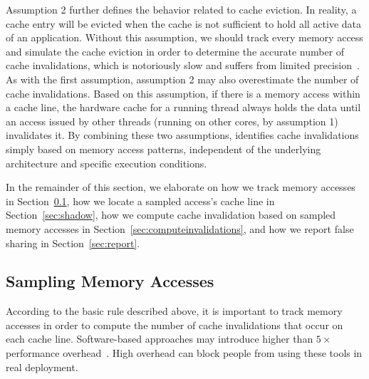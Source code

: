 Assumption 2 further defines the behavior related to cache eviction. In reality, a cache entry will be evicted when the cache is not sufficient to hold all active data of an application. Without this assumption, we should track every memory access and simulate the cache eviction in order to determine the accurate number of cache invalidations, which is notoriously slow and suffers from limited precision~\cite{falseshare:simulator}. As with the first assumption, assumption 2 may also overestimate the number of cache invalidations. Based on this assumption,  
if there is a memory access within a cache line, the hardware cache for a running thread always holds the data until an access issued by other threads (running on other cores, by assumption 1) invalidates it. %
By combining these two assumptions, \cheetah{} identifies cache invalidations simply based on memory access patterns, independent of the underlying architecture and specific execution conditions. 

In the remainder of this section, we elaborate on how we track memory accesses in Section~\ref{sec:perfcounter}, how we locate a sampled access's cache line in Section~\ref{sec:shadow}, how we compute cache invalidation based on sampled memory accesses in Section~\ref{sec:computeinvalidations}, and how we report false sharing in Section~\ref{sec:report}.

\subsection{Sampling Memory Accesses}
\label{sec:perfcounter}

According to the basic rule described above, it is important to track memory accesses in order to compute the number of cache invalidations that occur on each cache line. Software-based approaches may introduce higher than $5\times$ performance overhead~\cite{Predator, qinzhao}. High overhead can block people from using these tools in real deployment.

